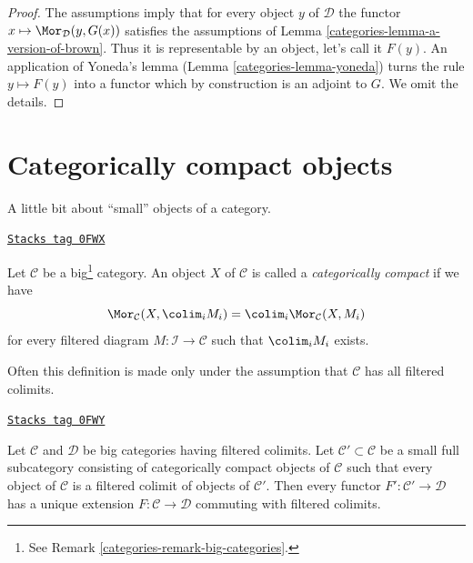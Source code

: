 \begin{proof}

The assumptions imply that for every object $y$ of $\mathcal{D}$
the functor $x \mapsto \Mor_\mathcal{D}(y, G(x))$ satisfies the
assumptions of Lemma \ref{categories-lemma-a-version-of-brown}.
Thus it is representable by an object, let's call it $F(y)$.
An application of Yoneda's lemma (Lemma \ref{categories-lemma-yoneda})
turns the rule $y \mapsto F(y)$ into a functor which
by construction is an adjoint to $G$. We omit the details.
\end{proof}

\section{Categorically compact objects}
\label{categories-section-compact}
A little bit about ``small'' objects of a category.

\begin{definition}
\label{categories-definition-compact-object}
\href{https://stacks.math.columbia.edu/tag/0FWX}{\texttt{Stacks tag 0FWX}}

Let $\mathcal{C}$ be a big\footnote{See Remark \ref{categories-remark-big-categories}.}
category. An object $X$ of $\mathcal{C}$ is called a {\it categorically compact}
if we have
$$
\Mor_\mathcal{C}(X, \colim_i M_i) =
\colim_i \Mor_\mathcal{C}(X, M_i)
$$
for every filtered diagram $M : \mathcal{I} \to \mathcal{C}$ such that
$\colim_i M_i$ exists.
\end{definition}

Often this definition is made only under the assumption that $\mathcal{C}$
has all filtered colimits.

\begin{lemma}
\label{categories-lemma-extend-functor-by-colim}
\href{https://stacks.math.columbia.edu/tag/0FWY}{\texttt{Stacks tag 0FWY}}

Let $\mathcal{C}$ and $\mathcal{D}$ be big categories having filtered
colimits. Let $\mathcal{C}' \subset \mathcal{C}$ be a small full subcategory
consisting of categorically compact objects of $\mathcal{C}$ such that every
object of $\mathcal{C}$ is a filtered colimit of objects of $\mathcal{C}'$.
Then every functor $F' : \mathcal{C}' \to \mathcal{D}$ has a unique
extension $F : \mathcal{C} \to \mathcal{D}$ commuting with filtered colimits.
\end{lemma}

